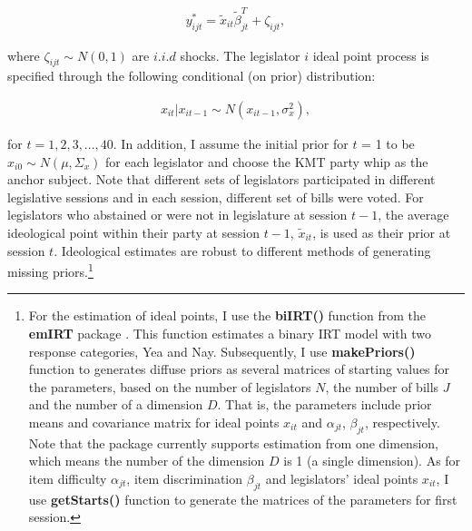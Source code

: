 \begin{equation}
\begin{aligned}
{y_{ijt}^{*}=\tilde{x}_{it}\tilde{\beta}_{jt}^{T}+\zeta_{ijt},}
\end{aligned}
\end{equation}


\noindent where $\zeta_{ijt}\sim N(0,1)$ are $i.i.d$ shocks. The legislator $i$ ideal point process is specified through the following conditional (on prior) distribution:

\begin{equation}
\begin{aligned}
{x_{it}|x_{it-1}\sim N(x_{it-1},\sigma_{x}^{2}),}\label{eq:ideal-point}
\end{aligned}
\end{equation}

\noindent for $t=1,2,3,...,40$. In addition, I assume the initial prior for $t$ = 1 to be $x_{i0}\sim N(\mu,\Sigma_{x})$ for each legislator and choose the KMT party whip as the anchor subject. Note that different sets of legislators participated in different legislative sessions and in each session, different set of bills were voted. For legislators who abstained or were not in legislature at session $t-1$, the average ideological point within their party at session $t-1$, $\tilde{x}_{it}$, is used as their prior at session $t$. Ideological estimates are robust to different methods of generating missing priors.\footnote{For the estimation of ideal points, I use the \textbf{biIRT()} function from the \textbf{emIRT} package \citep[see][]{emIRT2021}. This function estimates a binary IRT model with two response categories, Yea and Nay. Subsequently, I use \textbf{makePriors()} function to generates diffuse priors as several matrices of starting values for the parameters, based on the number of legislators $N$, the number of bills $J$ and the number of a dimension $D$. That is, the parameters include prior means and covariance matrix for ideal points $x_{it}$ and $\alpha_{jt}$, $\beta_{jt}$, respectively. Note that the package currently supports estimation from one dimension, which means the number of the dimension $D$ is 1 (a single dimension). As for item difficulty $\alpha_{jt}$, item discrimination $\beta_{jt}$ and legislators' ideal points $x_{it}$, I use \textbf{getStarts()} function to generate the matrices of the parameters for first session.} 

